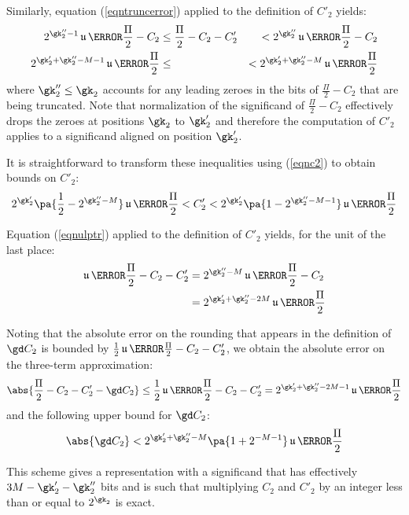 \documentclass[10pt, a4paper, twoside]{basestyle}
\DeclareMathOperator{\ULP}{\mathfrak u}
\begin{document}
Similarly, equation (\ref{eqntruncerror}) applied to the definition of $C'_2$ yields:
\begin{alignat*}{2}
2^{\gk''_2 - 1} \ULP\of{\frac{\Pi}{2} - C_2} &\leq \frac{\Pi}{2} - C_2 - C'_2 &< 2^{\gk''_2} \ULP\of{\frac{\Pi}{2} - C_2} \\
2^{\gk'_2 + \gk''_2 - M - 1} \ULP\of{\frac{\Pi}{2}} &\leq &< 2^{\gk'_2 + \gk''_2 - M} \ULP\of{\frac{\Pi}{2}}
\end{alignat*}
where $\gk''_2 \leq \gk_2$ accounts for any leading zeroes in the bits of $\frac{\Pi}{2} - C_2$ that are being truncated.  Note that normalization of the significand of $\frac{\Pi}{2} - C_2$ effectively drops the zeroes at positions $\gk_2$ to $\gk'_2$ and therefore the computation of $C'_2$ applies to a significand aligned on position $\gk'_2$.

It is straightforward to transform these inequalities using (\ref{eqnc2}) to obtain bounds on $C'_2$:
\[
2^{\gk'_2} \pa{\frac{1}{2} - 2^{\gk''_2 - M}} \ULP\of{\frac{\Pi}{2}} < C'_2 < 2^{\gk'_2} \pa{1 - 2^{\gk''_2 - M - 1}} \ULP\of{\frac{\Pi}{2}}
\]

Equation (\ref{eqnulptr}) applied to the definition of $C'_2$ yields, for the unit of the last place:
\begin{align*}
\ULP\of{\frac{\Pi}{2} - C_2 - C'_2} &= 2^{\gk''_2 - M} \ULP\of{\frac{\Pi}{2} - C_2} \\
&= 2^{\gk'_2 + \gk''_2 - 2 M} \ULP\of{\frac{\Pi}{2}}
\end{align*}

Noting that the absolute error on the rounding that appears in the definition of $\gd C_2$ is bounded by $\frac{1}{2} \ULP\of{\frac{\Pi}{2} - C_2 - C'_2}$, we obtain the absolute error on the three-term approximation:
\begin{align}
\abs{\frac{\Pi}{2} - C_2 - C'_2 - \gd C_2} \leq \frac{1}{2} \ULP\of{\frac{\Pi}{2} - C_2 - C'_2} = 2^{\gk'_2 + \gk''_2 - 2 M - 1} \ULP\of{\frac{\Pi}{2}}
\label{eqnpithreeterms}
\end{align}
and the following upper bound for $\gd C_2$:
\begin{equation}
\abs{\gd C_2} < 2^{\gk'_2 + \gk''_2 - M} \pa{1 + 2^{-M - 1}} \ULP\of{\frac{\Pi}{2}}
\label{eqnabsdc2}
\end{equation}
 
This scheme gives a representation with a significand that has effectively $3 M - \gk'_2 - \gk''_2$ bits and is such that multiplying $C_2$ and $C'_2$ by an integer less than or equal to $2^{\gk_2}$ is exact.
\end{document}
